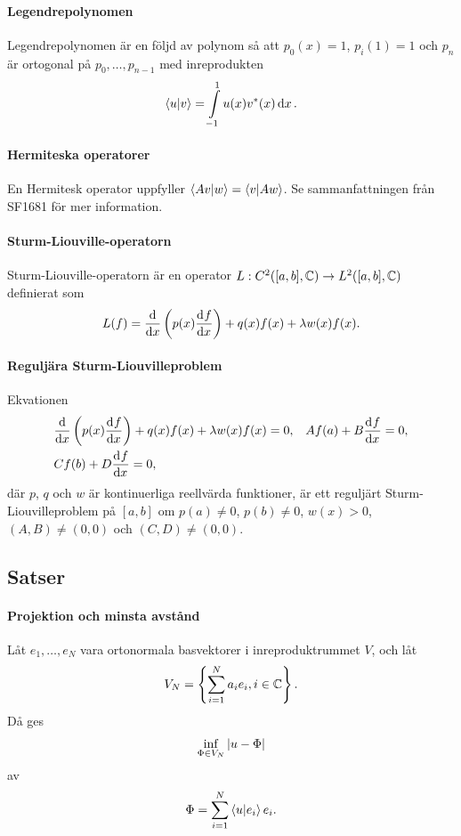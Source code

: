 \paragraph{Legendrepolynomen}
Legendrepolynomen är en följd av polynom så att $p_{0}(x) = 1$, $p_{i}(1) = 1$ och $p_{n}$ är ortogonal på $p_{0}, \dots, p_{n - 1}$ med inreprodukten
\begin{align*}
	\bra{u}\ket{v} = \int\limits_{-1}^{1}u(x)v^{*}(x)\dd{x}.
\end{align*}

\paragraph{Hermiteska operatorer}
En Hermitesk operator uppfyller $\bra{Av}\ket{w} = \bra{v}\ket{Aw}$. Se sammanfattningen från SF1681 för mer information.

\paragraph{Sturm-Liouville-operatorn}
Sturm-Liouville-operatorn är en operator $L: C^{2}([a, b], \mathbb{C}) \to L^{2}([a, b], \mathbb{C})$ definierat som
\begin{align*}
	L(f) = \dv{x}\left(p(x)\dv[]{f}{x} (x)\right) + q(x)f(x) + \lambda w(x)f(x).
\end{align*}

\paragraph{Reguljära Sturm-Liouvilleproblem}
Ekvationen
\begin{align*}
	&\dv{x}\left(p(x)\dv[]{f}{x} (x)\right) + q(x)f(x) + \lambda w(x)f(x) = 0,
	&Af(a) + B\dv[]{f}{x} (a) = 0, \\
	&Cf(b) + D\dv[]{f}{x} (b) = 0,
\end{align*}
där $p$, $q$ och $w$ är kontinuerliga reellvärda funktioner, är ett reguljärt Sturm-Liouvilleproblem på $[a, b]$ om $p(a) \neq 0$, $p(b) \neq 0$,  $w(x) > 0$, $(A, B) \neq (0, 0)$ och $(C, D) \neq (0, 0)$.

\subsection{Satser}

\paragraph{Projektion och minsta avstånd}
Låt $e_{1}, \dots, e_{N}$ vara ortonormala basvektorer i inreproduktrummet $V$, och låt
\begin{align*}
	V_{N} = \left\{\sum\limits_{i = 1}^{N}a_{i}e_{i}, i\in\mathbb{C}\right\}.
\end{align*}
Då ges
\begin{align*}
	\inf\limits_{\Phi\in V_{N}}\abs{u - \Phi}
\end{align*}
av
\begin{align*}
	\Phi = \sum\limits_{i = 1}^{N}\bra{u}\ket{e_{i}}e_{i}.
\end{align*}

